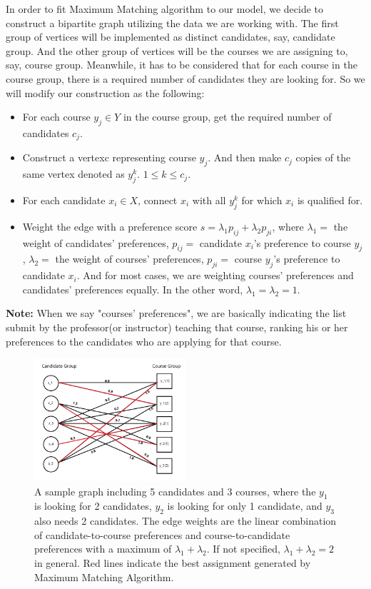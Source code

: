 \documentclass[twoside,twocolumn]{article}
\begin{document}
    In order to fit Maximum Matching algorithm to our model, we decide to construct a bipartite graph utilizing the data 
    we are working with. The first group of vertices will be implemented as distinct candidates, say, candidate group. 
    And the other group of vertices will be the courses we are assigning to, say, course group. Meanwhile, it has to be 
    considered that for each course in the course group, there is a required number of candidates they are looking for. 
    So we will modify our construction as the following:
    \begin{itemize}
        \item For each course $y_j \in Y$ in the course group, get the required number of candidates $c_j$.
        \item Construct a vertexc representing course $y_j$. And then make $c_j$ copies of the same vertex denoted as $y_j^k$.
        $1\leq k\leq c_j$.
        \item For each candidate $x_i\in X$, connect $x_i$ with all $y_j^k$ for which $x_i$ is qualified for.
        \item Weight the edge with a preference score $s = \lambda_1 p_{ij} + \lambda_2 p_{ji}$, where $\lambda_1=$ the weight of 
        candidates' preferences, $p_{ij}=$ candidate $x_i$'s preference to course $y_j$, $\lambda_2=$ the weight of 
        courses' preferences, $p_{ji}=$ course $y_j$'s preference to candidate $x_i$.  And for most cases, we are weighting
        courses' preferences and candidates' preferences equally. In the other word, $\lambda_1=\lambda_2=1$.
    \end{itemize}
    \textbf{Note:} When we say "courses' preferences", we are basically indicating the list submit by the professor(or instructor) 
    teaching that course, ranking his or her preferences to the candidates who are applying for that course.
    \begin{figure}
        \centering
        \includegraphics[width=0.5\textwidth]{MM.png}
        \caption{A sample graph including 5 candidates and 3 courses, where the $y_1$ is looking for 2 candidates, $y_2$ is looking for
        only 1 candidate, and $y_3$ also needs 2 candidates. The edge weights are the linear combination of candidate-to-course preferences and
        course-to-candidate preferences with a maximum of $\lambda_1+\lambda_2$. If not specified, $\lambda_1+\lambda_2=2$ in general. Red lines
        indicate the best assignment generated by Maximum Matching Algorithm.}
    \end{figure}
\end{document}
